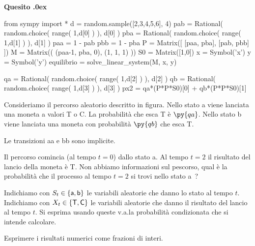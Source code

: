 \documentclass[11pt,twoside,a4paper]{article}
\newcounter{quesito}
\newenvironment{question}{\bigskip\addtocounter{quesito}{1}\bigskip\bigskip\par\textbf{Quesito \thequesito.\kern0ex}}{\par\vspace{\parskip}}
\begin{document}
\begin{question}%
\def\Pr{{\rm Pr\,}}
\def\pyl#1{\py{latex(#1)}}
\everymath{\displaystyle}
\renewcommand{\arraystretch}{2}
\begin{pycode}
from sympy import *
d = random.sample([2,3,4,5,6], 4)
pab = Rational( random.choice( range( 1,d[0] ) ), d[0] ) 
pba = Rational( random.choice( range( 1,d[1] ) ), d[1] ) 
paa = 1 - pab
pbb = 1 - pba
P  = Matrix([ [paa, pba], 
              [pab, pbb] ])
M  = Matrix(( (paa-1, pba, 0),
             (1,     1,   1) ))
S0 = Matrix([1,0])
x = Symbol('x')
y = Symbol('y')
equilibrio = solve_linear_system(M, x, y)



qa = Rational( random.choice( range( 1,d[2] ) ), d[2] ) 
qb = Rational( random.choice( range( 1,d[3] ) ), d[3] ) 
px2 = qa*(P*P*S0)[0] + qb*(P*P*S0)[1] 
\end{pycode}
Consideriamo il percorso aleatorio descritto in figura. Nello stato {\sf a} viene lanciata una moneta a valori {\sf T} o {\sf C}. La probabilità che esca {\sf T} è $\py{qa}$. Nello stato {\sf b} viene lanciata una moneta con probabilità $\py{qb}$ che esca {\sf T}.

\hfil
{}
\hfil Le transizioni {\sf aa} e {\sf bb} sono implicite.

Il percorso comincia (al tempo $t{=}0$) dallo stato {\sf a}. Al tempo $t=2$ il risultato del lancio della moneta è {\sf T}. Non abbiamo informazioni sul pescorso, qual è la probabilità che il processo al tempo $t{=}2$ si trovi nello stato {\sf a}~?

Indichiamo con $S_t\in\{{\sf a}, {\sf b}\}$ le variabili aleatorie che danno lo stato al tempo $t$. Indichiamo con $X_t\in\{{\sf T}, {\sf C}\}$ le variabili aleatorie che danno il risultato del lancio al tempo $t$. Si esprima usando queste v.a.\@ la probabilità condizionata che si intende calcolare. 

Esprimere i risultati numerici come frazioni di interi.



\end{question}
\end{document}
